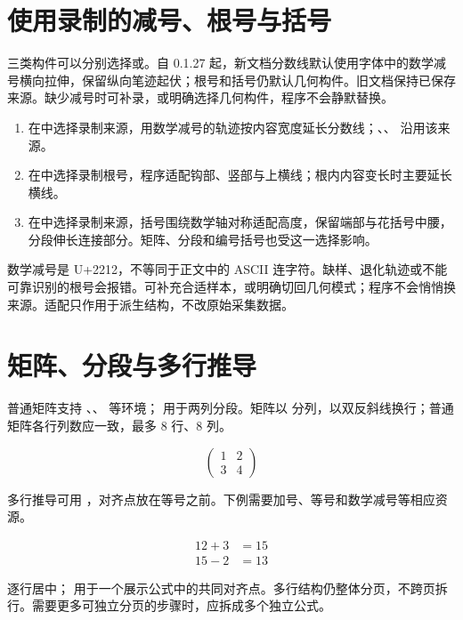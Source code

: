 \section{使用录制的减号、根号与括号}
三类构件可以分别选择或。自 0.1.27 起，新文档分数线默认使用字体中的数学减号横向拉伸，保留纵向笔迹起伏；根号和括号仍默认几何构件。旧文档保持已保存来源。缺少减号时可补录，或明确选择几何构件，程序不会静默替换。
\begin{enumerate}
\item 在中选择录制来源，用数学减号的轨迹按内容宽度延长分数线；\code{\bar}、\code{\overline}、\code{\underline} 沿用该来源。
\item 在中选择录制根号，程序适配钩部、竖部与上横线；根内内容变长时主要延长横线。
\item 在中选择录制来源，括号围绕数学轴对称适配高度，保留端部与花括号中腰，分段伸长连接部分。矩阵、分段和编号括号也受这一选择影响。
\end{enumerate}

数学减号是 U+2212，不等同于正文中的 ASCII 连字符。缺样、退化轨迹或不能可靠识别的根号会报错。可补充合适样本，或明确切回几何模式；程序不会悄悄换来源。适配只作用于派生结构，不改原始采集数据。

\section{矩阵、分段与多行推导}
普通矩阵支持 、、 等环境； 用于两列分段。矩阵以 \code{&} 分列，以双反斜线换行；普通矩阵各行列数应一致，最多 8 行、8 列。
\par\noindent\begin{minipage}{\linewidth}
\begin{Source}
$$
\begin{pmatrix}
1&2\\
3&4
\end{pmatrix}
$$
\end{Source}
\end{minipage}\par\medskip
多行推导可用 ，对齐点放在等号之前。下例需要加号、等号和数学减号等相应资源。
\par\noindent\begin{minipage}{\linewidth}
\begin{Source}
$$
\begin{aligned}
12+3&=15\\
15-2&=13
\end{aligned}
$$
\end{Source}
\end{minipage}\par\medskip
{} 逐行居中； 用于一个展示公式中的共同对齐点。多行结构仍整体分页，不跨页拆行。需要更多可独立分页的步骤时，应拆成多个独立公式。

